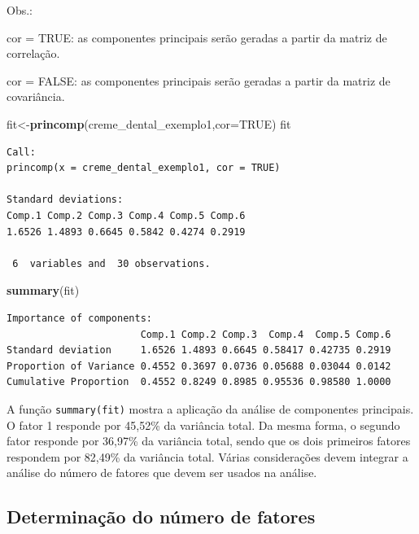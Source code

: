 \documentclass[12pt,brazil,oneside]{book}
\newenvironment{Shaded}{\begin{snugshade}}{\end{snugshade}}
\newcommand{\DataTypeTok}[1]{\textcolor[rgb]{0.13,0.29,0.53}{#1}}
\newcommand{\KeywordTok}[1]{\textcolor[rgb]{0.13,0.29,0.53}{\textbf{#1}}}
\newcommand{\NormalTok}[1]{#1}
\newcommand{\OtherTok}[1]{\textcolor[rgb]{0.56,0.35,0.01}{#1}}
\begin{document}
Obs.:

cor = TRUE: as componentes principais serão geradas a partir da matriz de correlação.

cor = FALSE: as componentes principais serão geradas a partir da matriz de covariância.

\begin{Shaded}
\begin{Highlighting}[]
\NormalTok{fit<-}\KeywordTok{princomp}\NormalTok{(creme_dental_exemplo1,}\DataTypeTok{cor=}\OtherTok{TRUE}\NormalTok{)}
\NormalTok{fit}
\end{Highlighting}
\end{Shaded}

\begin{verbatim}
Call:
princomp(x = creme_dental_exemplo1, cor = TRUE)

Standard deviations:
Comp.1 Comp.2 Comp.3 Comp.4 Comp.5 Comp.6 
1.6526 1.4893 0.6645 0.5842 0.4274 0.2919 

 6  variables and  30 observations.
\end{verbatim}

\begin{Shaded}
\begin{Highlighting}[]
\KeywordTok{summary}\NormalTok{(fit)}
\end{Highlighting}
\end{Shaded}

\begin{verbatim}
Importance of components:
                       Comp.1 Comp.2 Comp.3  Comp.4  Comp.5 Comp.6
Standard deviation     1.6526 1.4893 0.6645 0.58417 0.42735 0.2919
Proportion of Variance 0.4552 0.3697 0.0736 0.05688 0.03044 0.0142
Cumulative Proportion  0.4552 0.8249 0.8985 0.95536 0.98580 1.0000
\end{verbatim}

A função \texttt{summary(fit)} mostra a aplicação da análise de componentes principais. O fator 1
responde por 45,52\% da variância total. Da mesma forma, o segundo fator responde por 36,97\% da
variância total, sendo que os dois primeiros fatores respondem por 82,49\% da variância total. Várias
considerações devem integrar a análise do número de fatores que devem ser usados na análise.

\hypertarget{determinacao-do-numero-de-fatores}{%
\subsection{Determinação do número de fatores}\label{determinacao-do-numero-de-fatores}}
\end{document}
